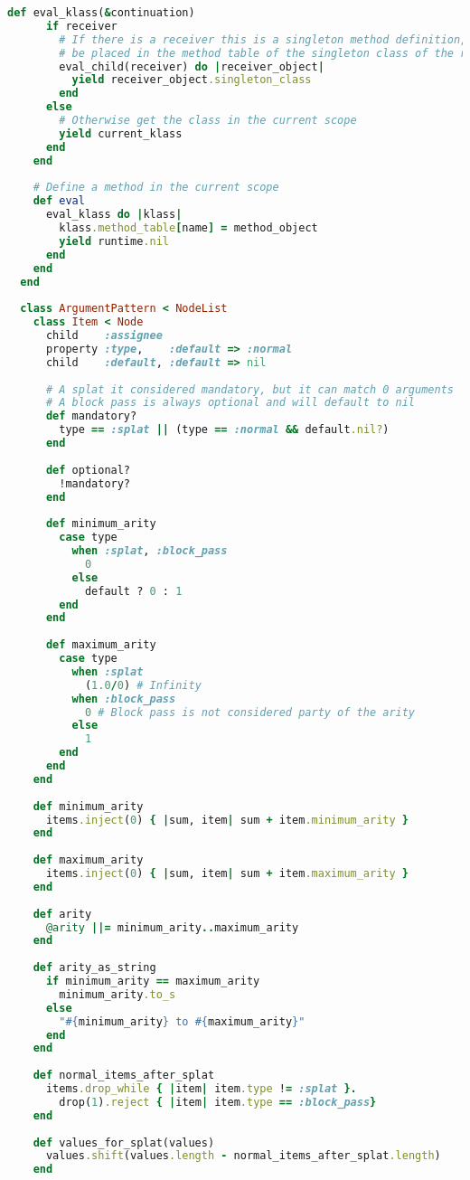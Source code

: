 \begin{lstlisting}[title={\small\ttfamily\bfseries ast/scopes.rb},language=Ruby]
    def eval_klass(&continuation)
      if receiver
        # If there is a receiver this is a singleton method definition, so the method should
        # be placed in the method table of the singleton class of the receiver
        eval_child(receiver) do |receiver_object|
          yield receiver_object.singleton_class
        end
      else
        # Otherwise get the class in the current scope
        yield current_klass
      end
    end
    
    # Define a method in the current scope
    def eval
      eval_klass do |klass|
        klass.method_table[name] = method_object
        yield runtime.nil
      end
    end
  end
  
  class ArgumentPattern < NodeList
    class Item < Node
      child    :assignee
      property :type,    :default => :normal
      child    :default, :default => nil
      
      # A splat it considered mandatory, but it can match 0 arguments
      # A block pass is always optional and will default to nil
      def mandatory?
        type == :splat || (type == :normal && default.nil?)
      end
      
      def optional?
        !mandatory?
      end
      
      def minimum_arity
        case type
          when :splat, :block_pass
            0
          else
            default ? 0 : 1
        end
      end
      
      def maximum_arity
        case type
          when :splat
            (1.0/0) # Infinity
          when :block_pass
            0 # Block pass is not considered party of the arity
          else
            1
        end
      end
    end
    
    def minimum_arity
      items.inject(0) { |sum, item| sum + item.minimum_arity }
    end
    
    def maximum_arity
      items.inject(0) { |sum, item| sum + item.maximum_arity }
    end
    
    def arity
      @arity ||= minimum_arity..maximum_arity
    end
    
    def arity_as_string
      if minimum_arity == maximum_arity
        minimum_arity.to_s
      else
        "#{minimum_arity} to #{maximum_arity}"
      end
    end
    
    def normal_items_after_splat
      items.drop_while { |item| item.type != :splat }.
        drop(1).reject { |item| item.type == :block_pass}
    end
    
    def values_for_splat(values)
      values.shift(values.length - normal_items_after_splat.length)
    end
    

\end{lstlisting}
